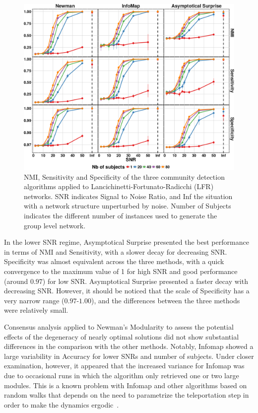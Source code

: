 \begin{figure}[!htb]
\includegraphics[width=\textwidth]{images/pacopaperfigure5.pdf}
\caption{NMI, Sensitivity and Specificity of the three community detection algorithms applied to Lancichinetti-Fortunato-Radicchi (LFR) networks. SNR indicates Signal to Noise Ratio, and Inf the situation with a network structure unperturbed by noise. Number of Subjects indicates the different number of instances used to generate the group level network.}
\label{fig:nmisensitivityspecificitylfr}
\end{figure}
In the lower SNR regime, Asymptotical Surprise presented the best performance in terms of NMI and Sensitivity, with a slower decay for decreasing SNR. 
Specificity was almost equivalent across the three methods, with a quick convergence to the maximum value of 1 for high SNR and good performance (around $0.97$) for low SNR.
Asymptotical Surprise presented a faster decay with decreasing SNR.
However, it should be noticed that the scale of Specificity has a very narrow range ($0.97$-$1.00$), and the differences between the three methods were relatively small.

Consensus analysis applied to Newman's Modularity to assess the potential effects of the degeneracy of nearly optimal solutions did not show substantial differences in the comparison with the other methods.
Notably, Infomap showed a large variability in Accuracy for lower SNRs and number of subjects.
Under closer examination, however, it appeared that the increased variance for Infomap was due to occasional runs in which the algorithm only retrieved one or two large modules.
This is a known problem with Infomap and other algorithms based on random walks that depends on the need to parametrize the teleportation step in order to make the dynamics ergodic~\cite{lambiotte2012}.

